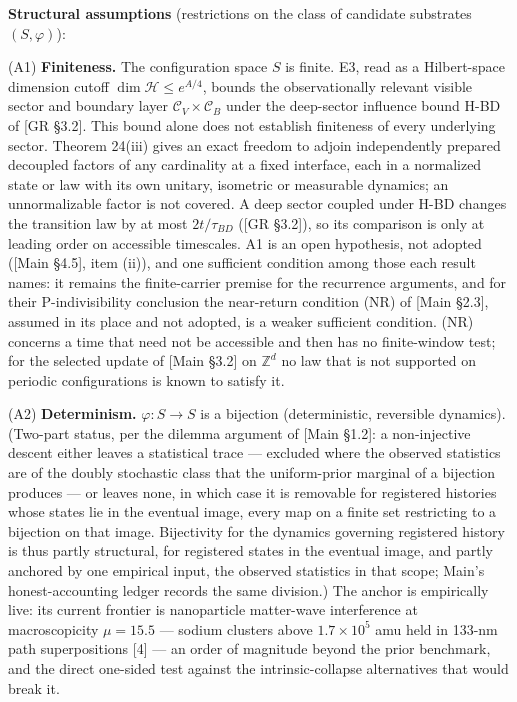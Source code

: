 \documentclass[
]{article}
\begin{document}
\textbf{Structural assumptions} (restrictions on the class of candidate
substrates \((S, \varphi)\)):

(A1) \textbf{Finiteness.} The configuration space \(S\) is finite. E3,
read as a Hilbert-space dimension cutoff \(\dim\mathcal H\le e^{A/4}\),
bounds the observationally relevant visible sector and boundary layer
\(\mathcal C_V\times\mathcal C_B\) under the deep-sector influence bound
H-BD of {[}GR §3.2{]}. This bound alone does not establish finiteness of
every underlying sector. Theorem 24(iii) gives an exact freedom to
adjoin independently prepared decoupled factors of any cardinality at a
fixed interface, each in a normalized state or law with its own unitary,
isometric or measurable dynamics; an unnormalizable factor is not
covered. A deep sector coupled under H-BD changes the transition law by
at most \(2t/\tau_{BD}\) ({[}GR §3.2{]}), so its comparison is only at
leading order on accessible timescales. A1 is an open hypothesis, not
adopted ({[}Main §4.5{]}, item (ii)), and one sufficient condition among
those each result names: it remains the finite-carrier premise for the
recurrence arguments, and for their P-indivisibility conclusion the
near-return condition (NR) of {[}Main §2.3{]}, assumed in its place and
not adopted, is a weaker sufficient condition. (NR) concerns a time that
need not be accessible and then has no finite-window test; for the
selected update of {[}Main §3.2{]} on \(\mathbb{Z}^d\) no law that is
not supported on periodic configurations is known to satisfy it.

(A2) \textbf{Determinism.} \(\varphi: S \to S\) is a bijection
(deterministic, reversible dynamics). (Two-part status, per the dilemma
argument of {[}Main §1.2{]}: a non-injective descent either leaves a
statistical trace --- excluded where the observed statistics are of the
doubly stochastic class that the uniform-prior marginal of a bijection
produces --- or leaves none, in which case it is removable for
registered histories whose states lie in the eventual image, every map
on a finite set restricting to a bijection on that image. Bijectivity
for the dynamics governing registered history is thus partly structural,
for registered states in the eventual image, and partly anchored by one
empirical input, the observed statistics in that scope; Main's
honest-accounting ledger records the same division.) The anchor is
empirically live: its current frontier is nanoparticle matter-wave
interference at macroscopicity \(\mu = 15.5\) --- sodium clusters above
\(1.7 \times 10^5\) amu held in 133-nm path superpositions {[}4{]} ---
an order of magnitude beyond the prior benchmark, and the direct
one-sided test against the intrinsic-collapse alternatives that would
break it.
\end{document}

